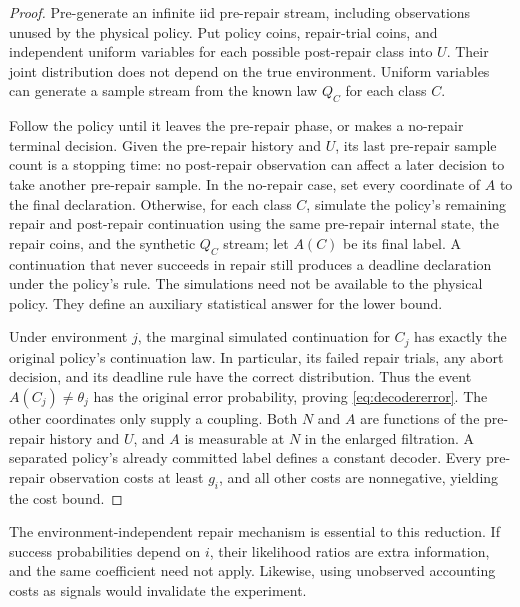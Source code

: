 \begin{proof}
Pre-generate an infinite iid pre-repair stream, including observations unused
by the physical policy. Put policy coins, repair-trial coins, and independent
uniform variables for each possible post-repair class into $U$.
Their joint distribution does not depend on the true environment. Uniform
variables can generate a sample stream from the known law $Q_C$ for each
class $C$.

Follow the policy until it leaves the pre-repair phase, or makes a no-repair
terminal decision. Given the pre-repair history and $U$, its last pre-repair
sample count is a stopping time: no post-repair observation can affect a later
decision to take another pre-repair sample. In the no-repair case, set every
coordinate of $A$ to the final declaration. Otherwise, for each class $C$,
simulate the policy's remaining repair and post-repair continuation using the
same pre-repair internal state, the repair coins, and the synthetic $Q_C$
stream; let $A(C)$ be its final label. A continuation that never succeeds in
repair still produces a deadline declaration under the policy's rule.
The simulations need not be available to the physical policy. They define
an auxiliary statistical answer for the lower bound.

Under environment $j$, the marginal simulated continuation for $C_j$ has
exactly the original policy's continuation law. In particular, its failed
repair trials, any abort decision, and its deadline rule have the correct
distribution. Thus the event $A(C_j)\ne\theta_j$ has the original error
probability, proving \eqref{eq:decodererror}. The other coordinates only
supply a coupling. Both $N$ and $A$ are functions of the pre-repair history
and $U$, and $A$ is measurable at $N$ in the enlarged filtration.
A separated policy's already committed label defines a constant decoder.
Every pre-repair observation costs at least $g_i$, and all other costs are
nonnegative, yielding the cost bound.
\end{proof}

The environment-independent repair mechanism is essential to this reduction.
If success probabilities depend on $i$, their likelihood ratios are extra
information, and the same coefficient need not apply. Likewise, using
unobserved accounting costs as signals would invalidate the experiment.

